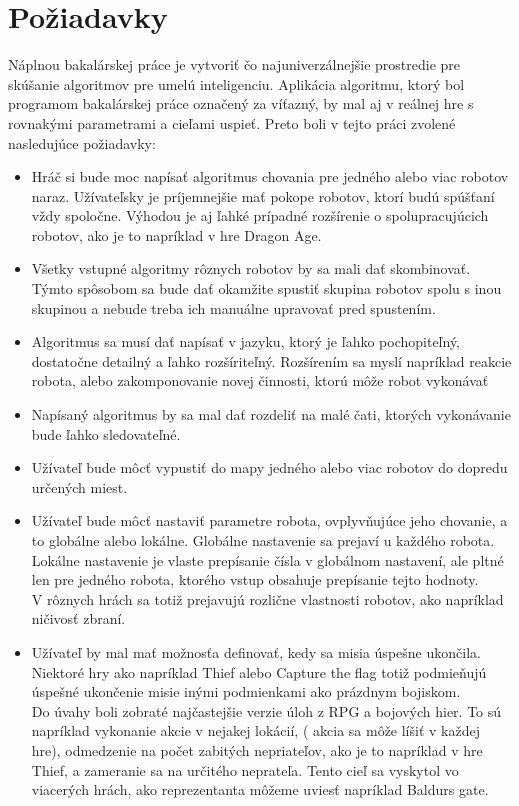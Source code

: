 \section{ Požiadavky }\label{poziadavky}
	Náplnou bakalárskej práce je vytvoriť čo najuniverzálnejšie prostredie pre skúšanie algoritmov pre umelú inteligenciu. Aplikácia algoritmu, ktorý bol programom bakalárskej práce označený za víťazný, by mal aj v reálnej hre s rovnakými parametrami a cieľami uspieť. Preto  boli  v tejto práci zvolené nasledujúce požiadavky:
\begin {itemize}
\item Hráč si bude moc napísať algoritmus chovania pre jedného alebo viac robotov naraz. Užívateľsky je príjemnejšie mať pokope robotov, ktorí budú spúšťaní vždy spoločne. Výhodou je aj ľahké prípadné rozšírenie o spolupracujúcich robotov, ako je to napríklad v hre Dragon Age.
\item Všetky vstupné algoritmy rôznych robotov by sa mali dať skombinovať.
	\\Týmto spôsobom sa bude dať okamžite spustiť skupina robotov spolu s inou skupinou a nebude treba ich manuálne upravovať pred spustením.
\item Algoritmus sa musí dať napísať v jazyku, ktorý je ľahko pochopiteľný, dostatočne detailný a ľahko rozšíriteľný.
	Rozšírením sa myslí napríklad reakcie robota, alebo zakomponovanie novej činnosti, ktorú môže robot vykonávať
\item Napísaný algoritmus by sa mal dať rozdeliť na malé čati, ktorých vykonávanie bude ľahko sledovateľné.
\item Užívateľ bude môcť vypustiť do mapy jedného alebo viac robotov do dopredu určených miest.
\item Užívateľ bude môcť nastaviť parametre robota, ovplyvňujúce jeho chovanie, a to globálne alebo lokálne. Globálne nastavenie sa prejaví u každého robota. Lokálne nastavenie je vlaste prepísanie čísla v globálnom nastavení, ale pltné len pre jedného robota, ktorého vstup obsahuje prepísanie tejto hodnoty.\\
	V rôznych hrách sa totiž prejavujú rozlične vlastnosti robotov, ako napríklad ničivosť zbraní.
\item Užívateľ by mal mať možnosťa definovať, kedy sa misia úspešne ukončila. \\
	Niektoré hry ako napríklad Thief alebo Capture the flag totiž podmieňujú úspešné ukončenie misie inými podmienkami ako prázdnym bojiskom.\\
	Do úvahy boli zobraté najčastejšie verzie úloh z RPG a bojových hier. To sú napríklad vykonanie akcie v nejakej lokácií, ( akcia sa môže líšiť v každej hre), odmedzenie na počet zabitých nepriateľov, ako je to napríklad v hre Thief, a zameranie sa na určitého neprateľa. Tento cieľ sa vyskytol vo viacerých hrách, ako reprezentanta môžeme uviesť napríklad Baldurs gate.

\end{itemize}
